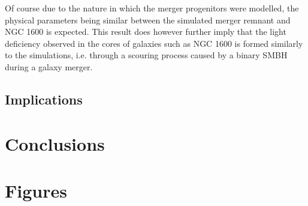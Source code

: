 \documentclass[english, oneside]{HYgradu}
\begin{document}
Of course due to the nature in which the merger progenitors were modelled, the physical parameters being similar between the simulated merger remnant and NGC 1600 is expected. This result does however further imply that the light deficiency observed in the cores of galaxies such as NGC 1600 is formed similarly to the simulations, i.e. through a scouring process caused by a binary SMBH during a galaxy merger.


\section{Implications}


\chapter{Conclusions}

\appendix

\chapter{Figures}
\end{document}
